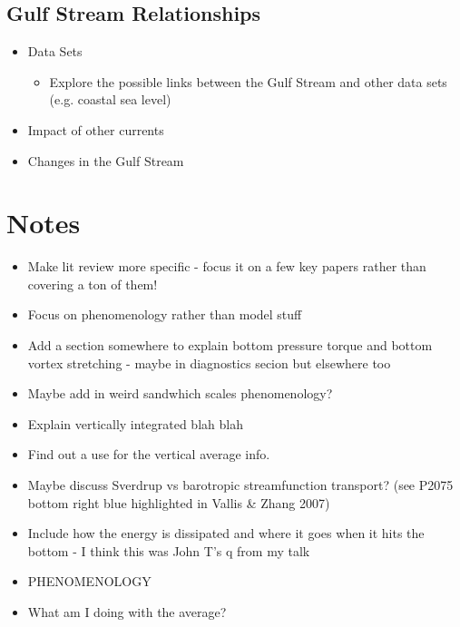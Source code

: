 \documentclass[a4paper,11pt]{article}
\begin{document}
\subsection{Gulf Stream Relationships}
\begin{itemize}
  \item Data Sets    \citep{Ezer2015}
  \begin{itemize}
    \item Explore the possible links between the Gulf Stream and other data sets (e.g. coastal sea level)
  \end{itemize}
  \item Impact of other currents    \citep{Ezer2015}
  \item Changes in the Gulf Stream \citep{Greatbatch1991} \citep{Ezer2015}
\end{itemize}


\section*{Notes}
\begin{itemize}
	\item Make lit review more specific - focus it on a few key papers rather than covering a ton of them!
	\item Focus on phenomenology rather than model stuff
	\item Add a section somewhere to explain bottom pressure torque and bottom vortex stretching - maybe in diagnostics secion but elsewhere too
	\item Maybe add in weird sandwhich scales phenomenology?
	\item Explain vertically integrated blah blah
	\item Find out a use for the vertical average info.
	\item Maybe discuss Sverdrup vs barotropic streamfunction transport? (see P2075 bottom right blue highlighted in Vallis \& Zhang 2007)
	\item Include how the energy is dissipated and where it goes when it hits the bottom - I think this was John T's q from my talk
	\item PHENOMENOLOGY
	\item What am I doing with the average?
\end{itemize}

%


%
%
%
%
%
%
\end{document}
